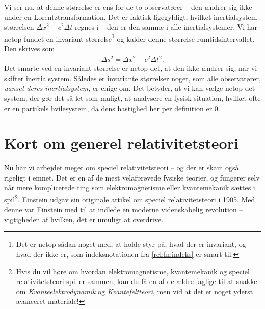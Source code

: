 \documentclass[crop=false, class=memoir]{standalone}
\begin{document}
%
Vi ser nu, at denne størrelse er ens for de to observatører -- den ændrer sig ikke under en Lorentztransformation.
Det er faktisk ligegyldigt, hvilket inertialsystem størrelsen $\Delta x^2-c^2\Delta t$ regnes i -- den er den samme i alle inertialsystemer.
Vi har netop fundet en invariant størrelse\footnote{Det er netop sådan noget med, at holde styr på, hvad der er invariant, og hvad der ikke er, som indeksnotationen fra \cref{rel:fn:indeks} er smart til.} og kalder denne størrelse rumtidsintervallet. Den skrives som
%
\begin{align} \label{rel:eq:rumtidsinterval}
    \Delta s^2 = \Delta x^2-c^2\Delta t^2.
\end{align}
%
Det smarte ved en invariant størrelse er netop det, at den ikke ændrer sig, når vi skifter inertialsystem. Således er invariante størrelser noget, som alle observatører, \emph{uanset deres inertialsystem}, er enige om.
Det betyder, at vi kan vælge netop det system, der gør det så let som muligt, at analysere en fysisk situation, hvilket ofte er en partikels hvilesystem, da dens hastighed her per definition er $0$. 






\section{Kort om generel relativitetsteori} \label{rel:sec:gr}%

Nu har vi arbejdet meget om speciel relativitetsteori -- og der er skam også rigeligt i emnet. Det er en af de mest velafprøvede fysiske teorier, og fungerer selv når mere komplicerede ting som elektromagnetisme eller kvantemekanik sættes i spil\footnote{Hvis du vil høre om hvordan elektromagnetisme, kvantemekanik og speciel relativitetsteori spiller sammen, kan du få en af de ældre faglige til at snakke om \emph{Kvanteelektrodynamik} og \emph{Kvantefeltteori}, men vid at det er noget yderst avanceret materiale!}. Einstein udgav sin originale artikel om speciel relativitetsteori i 1905. Med denne var Einstein med til at indlede en moderne videnskabelig revolution -- vigtigheden af hvilken, det er umuligt at overdrive. 
\end{document}
